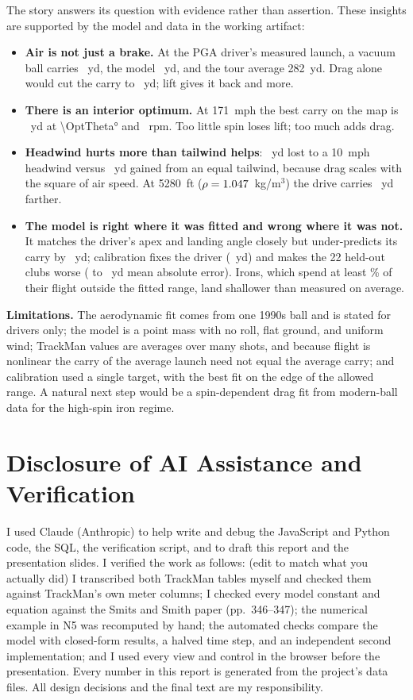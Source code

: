 \documentclass[11pt]{article}
\newcommand{\todo}[1]{\textcolor{orange!85!black}{#1}}
\begin{document}
The story answers its question with evidence rather than assertion. These insights are supported by
the model and data in the working artifact:
\begin{itemize}
\item \textbf{Air is not just a brake.} At the PGA driver's measured launch, a vacuum ball carries
\VacDrv{}~yd, the model \RawDrvCarry{}~yd, and the tour average 282~yd. Drag alone would cut the
carry to \DragOnly{}~yd; lift gives it back and more.
\item \textbf{There is an interior optimum.} At \SI{171}{mph} the best carry on the map is
\OptCarry{}~yd at \ang{\OptTheta} and \OptRpm{}~rpm. Too little spin loses lift; too much adds drag.
\item \textbf{Headwind hurts more than tailwind helps}: \HeadLoss{}~yd lost to a \SI{10}{mph}
headwind versus \TailGain{}~yd gained from an equal tailwind, because drag scales with the square of
air speed. At \SI{5280}{ft} ($\rho=1.047$~kg/m$^3$) the drive carries \DenverGain{}~yd farther.
\item \textbf{The model is right where it was fitted and wrong where it was not.} It matches the
driver's apex and landing angle closely but under-predicts its carry by \RawDrvErr{}~yd; calibration
fixes the driver (\CalErrYd{}~yd) and makes the 22 held-out clubs worse (\HeldRaw{} to \HeldCal{}~yd
mean absolute error). Irons, which spend at least \IronOutside\% of their flight outside the fitted
range, land \IronLandErr\textdegree{} shallower than measured on average.
\end{itemize}

\noindent\textbf{Limitations.} The aerodynamic fit comes from one 1990s ball and is stated for
drivers only; the model is a point mass with no roll, flat ground, and uniform wind; TrackMan values
are averages over many shots, and because flight is nonlinear the carry of the average launch need
not equal the average carry; and calibration used a single target, with the best fit on the edge of
the allowed range. A natural next step would be a spin-dependent drag fit from modern-ball data for
the high-spin iron regime.

\section*{Disclosure of AI Assistance and Verification}
I used Claude (Anthropic) to help write and debug the JavaScript and Python code, the SQL, the
verification script, and to draft this report and the presentation slides. I verified the work as
follows: \todo{(edit to match what you actually did)} I transcribed both TrackMan tables myself and
checked them against TrackMan's own meter columns; I checked every model constant and equation
against the Smits and Smith paper (pp.~346--347); the numerical example in N5 was recomputed by hand;
the \NChecks{} automated checks compare the model with closed-form results, a halved time step, and
an independent second implementation; and I used every view and control in the browser before the
presentation. Every number in this report is generated from the project's data files. All design
decisions and the final text are my responsibility.
\end{document}

